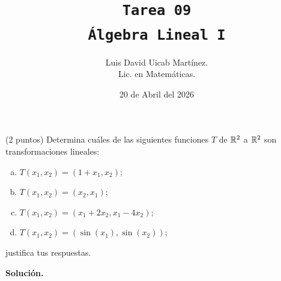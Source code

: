 \documentclass[11pt]{scrartcl}
\title{\texttt{Tarea 09
\\ Álgebra Lineal I}}
\author{Luis David Uicab Martínez. 
\\Lic. en Matemáticas.}
\date{20 de Abril del 2026}
\begin{document}
\maketitle
\begin{mdframed}[style=mdpurplebox, frametitle={Ejercicio 1, Tarea 09, Álgebra Lineal I}]
    (2 puntos) Determina cuáles de las siguientes funciones $T$ de $\mathbb R^2$ a $\mathbb R^2$ son transformaciones lineales:
    \begin{enumerate}[a)]
        \item $T(x_1,x_2) = (1+x_1,x_2)$;
        \item $T(x_1,x_2) = (x_2,x_1)$;
        \item $T(x_1,x_2) = (x_1+2x_2,x_1-4x_2)$;
        \item $T(x_1,x_2) = (\sin(x_1),\sin(x_2))$;
    \end{enumerate}
    justifica tus respuestas.
\end{mdframed}
\textbf{Solución.}
\end{document}
